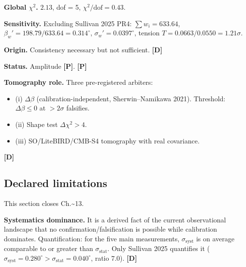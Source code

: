 ﻿\documentclass[11pt,letterpaper]{article}
\begin{document}
\begin{table}[htbp]
  \centering
  \small
\end{table}

\textbf{Global $\chi^2$.} $2{.}13$, dof = 5, $\chi^2/\mathrm{dof} = 0{.}43$.

\textbf{Sensitivity.} Excluding Sullivan 2025 PR4: $\sum w_i = 633{.}64$, $\beta_w' = 198{.}79/633{.}64 = 0{.}314^\circ$, $\sigma_w' = 0{.}0397^\circ$, tension $T = 0{.}0663/0{.}0550 = 1{.}21\sigma$.

\textbf{Origin.} Consistency necessary but not sufficient. \textbf{[D]}

\textbf{Status.} Amplitude \textbf{[P]}. \textbf{[P]}

\textbf{Tomography role.} Three pre-registered arbiters:

\begin{itemize}[leftmargin=*]
\item (i) $\Delta\beta$ (calibration-independent, Sherwin--Namikawa 2021). Threshold: $\Delta\beta \leq 0$ at $> 2\sigma$ falsifies.
\item (ii) Shape test $\Delta\chi^2 > 4$.
\item (iii) SO/LiteBIRD/CMB-S4 tomography with real covariance.
\end{itemize}

\textbf{[D]}
\subsection{Declared limitations}
This section closes Ch.\textasciitilde{}13.

\textbf{Systematics dominance.} It is a derived fact of the current observational landscape that no confirmation/falsification is possible while calibration dominates. Quantification: for the five main measurements, $\sigma_{\text{syst}}$ is on average comparable to or greater than $\sigma_{\text{stat}}$. Only Sullivan 2025 quantifies it ($\sigma_{\text{syst}} = 0{.}280^\circ > \sigma_{\text{stat}} = 0{.}040^\circ$, ratio $7{.}0$). \textbf{[D]}
\end{document}
